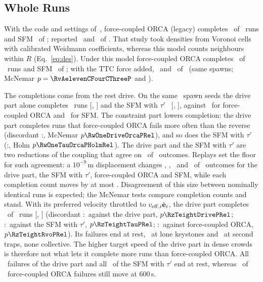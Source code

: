 \subsection{Whole Runs}\label{sec:att-whole}
With the code and settings of~\cite{gang2026}, force-coupled ORCA (legacy) completes \RvAelevenCThreePubK\ of \RvAelevenCThreePubN\ runs and SFM \RvAelevenCOnePubK\ of \RvAelevenCOnePubN; \cite{gang2026} reported \PendConfCThreeK\ and \PendConfCOneK\ of \PendConfN. That study took densities from Voronoi cells with calibrated Weidmann coefficients, whereas this model counts neighbours within $R$ (Eq.~\eqref{eq:des}). Under this model force-coupled ORCA completes \RvAelevenCThreeCfK\ of \RvAelevenCThreeCfN\ runs and SFM \RvAelevenCOneCfK\ of \RvAelevenCOneCfN; with the TTC force added, \RvAelevenCFourCfK\ and \RvAelevenCTwoCfK\ of \RvAelevenCFourCfN\ (same spawns; McNemar $p=\RvAelevenCFourCThreeP$ and \RvAelevenCTwoCOneP).

The completions come from the rest drive. On the same \RwOneN\ spawn seeds the drive part alone completes \RwOneDriveK\ runs [\RwOneDriveLo, \RwOneDriveHi] and the SFM with $\tau'$ \RwOneTauK\ [\RwOneTauLo, \RwOneTauHi], against \RwOneOrcaK\ for force-coupled ORCA and \RwOneSfmK\ for SFM. The constraint part lowers completion: the drive part completes runs that force-coupled ORCA fails more often than the reverse (discordant \RwOneDriveOrcaDiscA:\RwOneDriveOrcaDiscB, McNemar $p\RwOneDriveOrcaPRel$), and so does the SFM with $\tau'$ (\RwOneTauOrcaDiscA:\RwOneTauOrcaDiscB, Holm $p\RwOneTauOrcaPHolmRel$). The drive part and the SFM with $\tau'$ are two reductions of the coupling that agree on \RwOneAgreeSame\ of \RwOneN\ outcomes. Replays set the floor for such agreement: a $10^{-9}$\,m displacement changes \RzTsevenDriveChanges, \RzTsevenTauprimeChanges, \RzTsevenRvotwoChanges\ and \RzTsevenSfmChanges\ of \RwOneN\ outcomes for the drive part, the SFM with $\tau'$, force-coupled ORCA and SFM, while each completion count moves by at most \RzTsevenMaxShift. Disagreement of this size between nominally identical runs is expected; the McNemar tests compare completion counts and stand. With its preferred velocity throttled to $v_{{\rm eff},i}\hat{\mathbf e}_i$, the drive part completes \RzTeightK\ of \RzTeightN\ runs [\RzTeightLo, \RzTeightHi] (discordant \RzTeightDriveA:\RzTeightDriveB\ against the drive part, $p\RzTeightDrivePRel$; \RzTeightTauA:\RzTeightTauB\ against the SFM with $\tau'$, $p\RzTeightTauPRel$; \RzTeightRvoA:\RzTeightRvoB\ against force-coupled ORCA, $p\RzTeightRvoPRel$). Its failures end at rest, \RzTeightLone\ at lone keystones and \RzTeightSecond\ at second traps, none collective. The higher target speed of the drive part in dense crowds is therefore not what lets it complete more runs than force-coupled ORCA. All \RwOneDriveFail\ failures of the drive part and all \RwOneTauFail\ of the SFM with $\tau'$ end at rest, whereas \EsixCThreeFailMoving\ of \EsixCThreeFail\ force-coupled ORCA failures still move at 600\,s.

